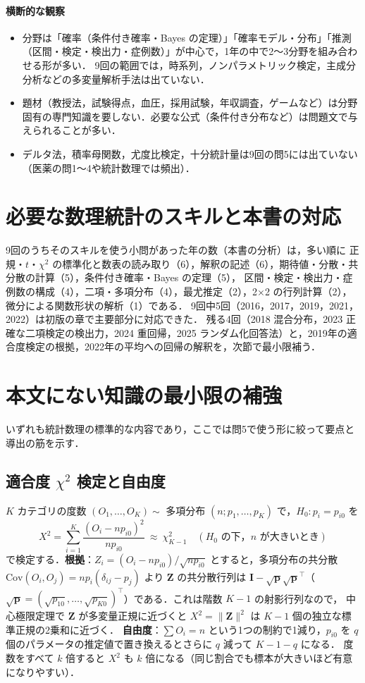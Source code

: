 \documentclass[a4paper,11pt,openany]{ltjsbook}
\newcommand{\Cov}{\mathrm{Cov}}
\newcommand{\transp}{^{\top}}
\begin{document}
\paragraph{横断的な観察}
\begin{itemize}
\item 分野は「確率（条件付き確率・Bayes の定理）」「確率モデル・分布」「推測（区間・検定・検出力・症例数）」が中心で，1年の中で2〜3分野を組み合わせる形が多い．
      9回の範囲では，時系列，ノンパラメトリック検定，主成分分析などの多変量解析手法は出ていない．
\item 題材（教授法，試験得点，血圧，採用試験，年収調査，ゲームなど）は分野固有の専門知識を要しない．必要な公式（条件付き分布など）は問題文で与えられることが多い．
\item デルタ法，積率母関数，尤度比検定，十分統計量は9回の問5には出ていない（医薬の問1〜4や統計数理では頻出）．
\end{itemize}

\section{必要な数理統計のスキルと本書の対応}\label{sec:G-skills}
9回のうちそのスキルを使う小問があった年の数（本書の分析）は，多い順に
正規・$t$・$\chi^2$ の標準化と数表の読み取り（6），解釈の記述（6），期待値・分散・共分散の計算（5），条件付き確率・Bayes の定理（5），
区間・検定・検出力・症例数の構成（4），二項・多項分布（4），最尤推定（2），2×2 の行列計算（2），微分による関数形状の解析（1）である．
9回中5回（2016，2017，2019，2021，2022）は初版の章で主要部分に対応できた．
残る4回（2018 混合分布，2023 正確な二項検定の検出力，2024 重回帰，2025 ランダム化回答法）と，2019年の適合度検定の根拠，2022年の平均への回帰の解釈を，次節で最小限補う．

\section{本文にない知識の最小限の補強}\label{sec:G-gaps}
いずれも統計数理の標準的な内容であり，ここでは問5で使う形に絞って要点と導出の筋を示す．

\subsection{適合度 \texorpdfstring{$\chi^2$}{χ²} 検定と自由度}\label{subsec:G-gof}
$K$ カテゴリの度数 $(O_1,\dots,O_K)\sim$ 多項分布 $(n;p_1,\dots,p_K)$ で，$H_0:p_i=p_{i0}$ を
\[
X^2=\sum_{i=1}^K\frac{(O_i-np_{i0})^2}{np_{i0}}\ \approx\ \chi^2_{K-1}\quad(H_0\text{ の下，}n\text{ が大きいとき})
\]
で検定する．\textbf{根拠}：$Z_i=(O_i-np_{i0})/\sqrt{np_{i0}}$ とすると，多項分布の共分散 $\Cov(O_i,O_j)=n p_i(\delta_{ij}-p_j)$ より
$\bm Z$ の共分散行列は $\bm I-\sqrt{\bm p}\sqrt{\bm p}\transp$（$\sqrt{\bm p}=(\sqrt{p_{10}},\dots,\sqrt{p_{K0}})\transp$）である．これは階数 $K-1$ の射影行列なので，
中心極限定理で $\bm Z$ が多変量正規に近づくと $X^2=\|\bm Z\|^2$ は $K-1$ 個の独立な標準正規の2乗和に近づく．
\textbf{自由度}：$\sum O_i=n$ という1つの制約で1減り，$p_{i0}$ を $q$ 個のパラメータの推定値で置き換えるとさらに $q$ 減って $K-1-q$ になる．
度数をすべて $k$ 倍すると $X^2$ も $k$ 倍になる（同じ割合でも標本が大きいほど有意になりやすい）．
\end{document}
